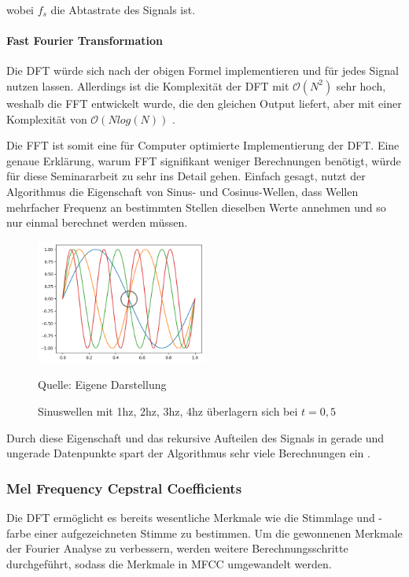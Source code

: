 wobei $f_s$ die Abtastrate des Signals ist.

\paragraph{Fast Fourier Transformation}

Die \ac{DFT} würde sich nach der obigen Formel implementieren und für jedes Signal nutzen lassen.
Allerdings ist die Komplexität der \ac{DFT} mit $\mathcal{O}(N^2)$ sehr hoch, weshalb die \ac{FFT} entwickelt wurde, die den gleichen Output liefert, aber mit einer Komplexität von $\mathcal{O}(N log(N))$ \autocite[vgl.][S. 338]{beucher_signale_2011}.

Die \ac{FFT} ist somit eine für Computer optimierte Implementierung der \ac{DFT}.
Eine genaue Erklärung, warum \ac{FFT} signifikant weniger Berechnungen benötigt, würde für diese Seminararbeit zu sehr ins Detail gehen.
Einfach gesagt, nutzt der Algorithmus die Eigenschaft von Sinus- und Cosinus-Wellen, dass Wellen mehrfacher Frequenz an bestimmten Stellen dieselben Werte annehmen und so nur einmal berechnet werden müssen.

\begin{figure}
    \centering
    \includegraphics[width=0.5\textwidth]{images/fft-advantage.png}
    \caption{Sinuswellen mit 1hz, 2hz, 3hz, 4hz überlagern sich bei $t=0,5$}{Quelle: Eigene Darstellung}
    \label{fig:fft-advantage}
\end{figure}\noindent

Durch diese Eigenschaft und das rekursive Aufteilen des Signals in gerade und ungerade Datenpunkte spart der Algorithmus sehr viele Berechnungen ein \autocite[vgl.][S. 643]{oppenheim_discrete-time_1999}.

\subsubsection{Mel Frequency Cepstral Coefficients}
Die \ac{DFT} ermöglicht es bereits wesentliche Merkmale wie die Stimmlage und -farbe einer aufgezeichneten Stimme zu bestimmen.
Um die gewonnenen Merkmale der Fourier Analyse zu verbessern, werden weitere Berechnungsschritte durchgeführt, sodass die Merkmale in \ac{MFCC} umgewandelt werden.

